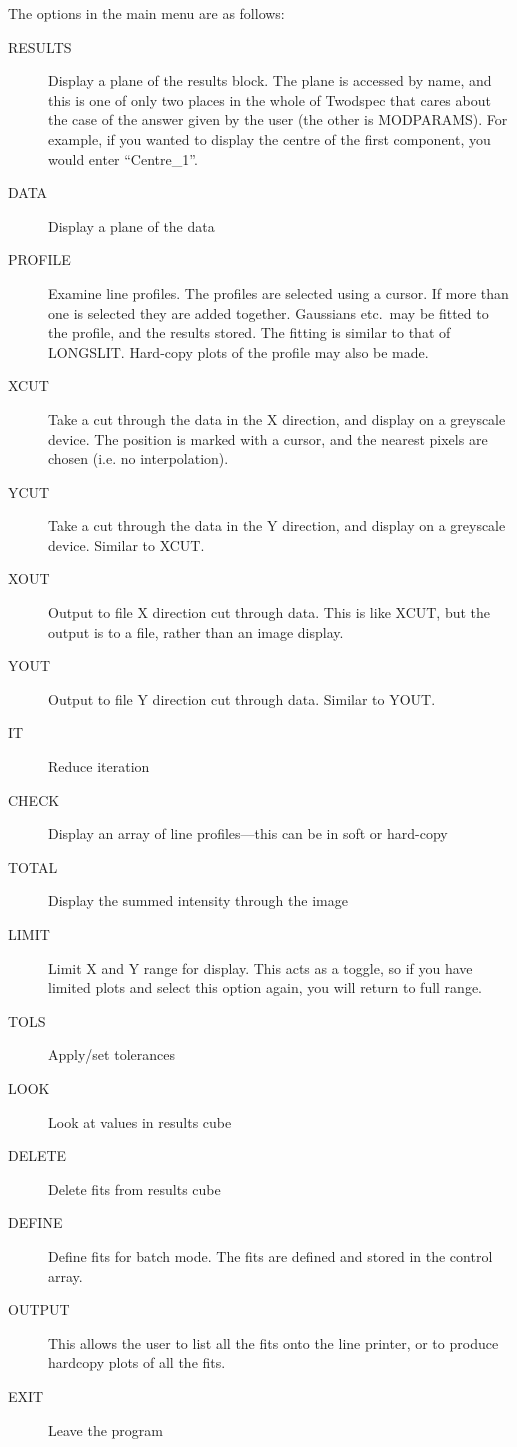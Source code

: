 The options in the main menu are as follows:
\begin{description}
\item[RESULTS] Display a plane of the results block.
The plane is accessed by name, and this is one of only two places in the
whole of Twodspec that cares about the case of the answer given by the
user (the other is MODPARAMS).
For example, if you wanted to display the centre of the first component,
you would enter ``Centre\_1''.
\item[DATA] Display a plane of the data
\item[PROFILE] Examine line profiles.
The profiles are selected using a cursor.
If more than one is selected they are added together. Gaussians  etc.\
may be fitted to the profile, and the results stored.
The fitting is similar to that of LONGSLIT.
Hard-copy plots of the profile may also be made.
\item[XCUT] Take a cut through the data in the X direction, and
display on a greyscale device.
The position is marked with a cursor, and the nearest pixels are chosen
(i.e. no interpolation).
\item[YCUT] Take a cut through the data in the Y direction, and
display on a greyscale device.
Similar to XCUT.
\item[XOUT] Output to file X direction cut through data.
This is like XCUT, but the output is to a file, rather than an image
display.
\item[YOUT] Output to file Y direction cut through data.
Similar to YOUT.
\item[IT] Reduce iteration
\item[CHECK] Display an array of line profiles---this can be in soft
or hard-copy
\item[TOTAL] Display the summed intensity through the image
\item[LIMIT] Limit X and Y range for display.
This acts as a toggle, so if you have limited plots and select this
option again, you will return to full range.
\item[TOLS] Apply/set tolerances
\item[LOOK] Look at values in results cube
\item[DELETE] Delete fits from results cube
\item[DEFINE] Define fits for batch mode. The fits are defined and
stored in the control array.
\item[OUTPUT] This allows the user to list all the fits onto the
line printer, or to produce hardcopy plots of all the fits.
\item[EXIT] Leave the program

\end{description}

